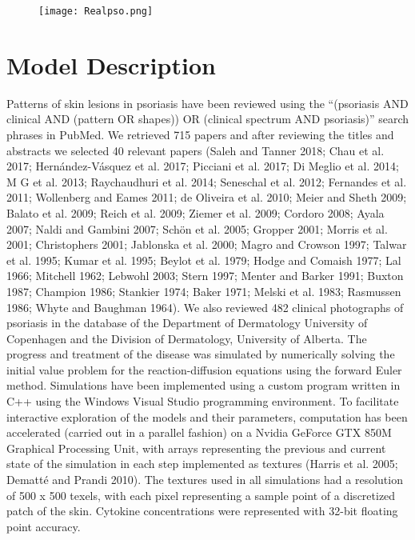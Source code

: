 \begin{figure}[!ht]
	\centering
	\texttt{[image: Realpso.png]}
	\label{fig:pso1}
\end{figure}
		
\section{Model Description}
Patterns of skin lesions in psoriasis have been reviewed using the “(psoriasis AND clinical AND (pattern OR shapes)) OR (clinical spectrum AND psoriasis)” search phrases in PubMed. We retrieved 715 papers and after reviewing the titles and abstracts we selected 40 relevant papers (Saleh and Tanner 2018; Chau et al. 2017; Hernández-Vásquez et al. 2017; Picciani et al. 2017; Di Meglio et al. 2014; M G et al. 2013; Raychaudhuri et al. 2014; Seneschal et al. 2012; Fernandes et al. 2011; Wollenberg and Eames 2011; de Oliveira et al. 2010; Meier and Sheth 2009; Balato et al. 2009; Reich et al. 2009; Ziemer et al. 2009; Cordoro 2008; Ayala 2007; Naldi and Gambini 2007; Schön et al. 2005; Gropper 2001; Morris et al. 2001; Christophers 2001; Jablonska et al. 2000; Magro and Crowson 1997; Talwar et al. 1995; Kumar et al. 1995; Beylot et al. 1979; Hodge and Comaish 1977; Lal 1966; Mitchell 1962; Lebwohl 2003; Stern 1997; Menter and Barker 1991; Buxton 1987; Champion 1986; Stankier 1974; Baker 1971; Melski et al. 1983; Rasmussen 1986; Whyte and Baughman 1964). We also reviewed 482 clinical photographs of psoriasis in the database of the Department of Dermatology University of Copenhagen and the Division of Dermatology, University of Alberta. 
The progress and treatment of the disease was simulated by numerically solving the initial value problem for the reaction-diffusion equations using the forward Euler method.  Simulations have been implemented using a custom program written in C++ using the Windows Visual Studio programming environment. To facilitate interactive exploration of the models and their parameters, computation has been accelerated (carried out in a parallel fashion) on a Nvidia GeForce GTX 850M Graphical Processing Unit, with arrays representing the previous and current state of the simulation in each step implemented as textures (Harris et al. 2005; Dematté and Prandi 2010). The textures used in all simulations had a resolution of 500 x 500 texels, with each pixel representing a sample point of a discretized patch of the skin.  Cytokine concentrations were represented with 32-bit floating point accuracy. 

